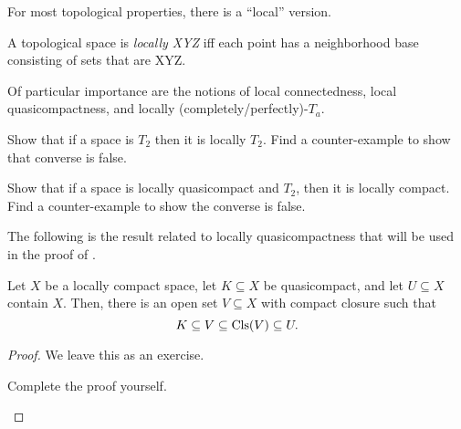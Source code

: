For most topological properties, there is a ``local'' version.
\begin{mdf}\label{LocallyXYZ}
A topological space is \emph{locally XYZ} iff each point has a neighborhood base consisting of sets that are XYZ.
\end{mdf}
Of particular importance are the notions of local connectedness, local quasicompactness, and locally (completely/perfectly)-$T_a$.
\begin{exr}
Show that if a space is $T_2$ then it is locally $T_2$.  Find a counter-example to show that converse is false.
\end{exr}
\begin{exr}
Show that if a space is locally quasicompact and $T_2$, then it is locally compact.  Find a counter-example to show the converse is false.
\end{exr}
The following is the result related to locally quasicompactness that will be used in the proof of .
\begin{prp}\label{prp5.2.4}
Let $X$ be a locally compact space, let $K\subseteq X$ be quasicompact, and let $U\subseteq X$ contain $X$.  Then, there is an open set $V\subseteq X$ with compact closure such that
\begin{equation}
K\subseteq V\subseteq \operatorname{Cls} (V)\subseteq U.
\end{equation}
\begin{proof}
We leave this as an exercise.
\begin{exr}
Complete the proof yourself.
\end{exr}
\end{proof}
\end{prp}
